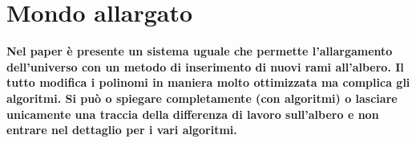 \section{Mondo allargato}
\textbf{Nel paper è presente un sistema uguale che permette l'allargamento dell'universo con un metodo di inserimento di nuovi rami all'albero. Il tutto modifica i polinomi in maniera molto ottimizzata ma complica gli algoritmi. Si può o spiegare completamente (con algoritmi) o lasciare unicamente una traccia della differenza di lavoro sull'albero e non entrare nel dettaglio per i vari algoritmi.}
